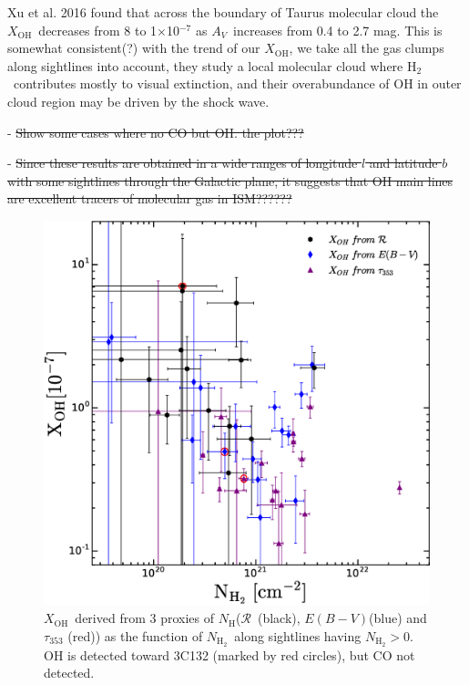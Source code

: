 \documentclass[preprint]{emulateapj}
\def\av{$A_{V}$}
\def\ebv{$E(B{-}V)$}
\def\h2{H$_2$}
\def\NHm{$N_{\mathrm{H}_{2}}$}
\def\NH{$N_\mathrm{H}$}
\def\t353{$\tau_{353}$}
\def\rad{$\mathcal{R}$}
\def\xoh{$X_\mathrm{OH}$}
\begin{document}
Xu et al. 2016 found that across the boundary of Taurus molecular cloud the \xoh\ decreases from 8 to 1$\times$10$^{-7}$ as \av\ increases from 0.4 to 2.7 mag. This is somewhat consistent(?) with the trend of our \xoh, we take all the gas clumps along sightlines into account, they study a local molecular cloud where \h2\ contributes mostly to visual extinction, and their overabundance of OH in outer cloud region may be driven by the shock wave. 

- \sout{Show some cases where no CO but OH. the plot???}

- \sout{Since these results are obtained in a wide ranges of longitude $l$ and latitude $b$ with some sightlines through the Galactic plane, it suggests that OH main lines are excellent tracers of molecular gas in ISM??????}

\begin{figure}
\includegraphics[width=1.0\linewidth]{fig/xoh_vs_nh2.eps}
\caption{\xoh\ derived from 3 proxies of \NH (\rad\ (black), \ebv (blue) and \t353 (red)) as the function of \NHm\ along sightlines having \NHm$>$0. OH is detected toward 3C132 (marked by red circles), but CO not detected.}
\label{fig:hist_xoh}
\end{figure}
\end{document}
